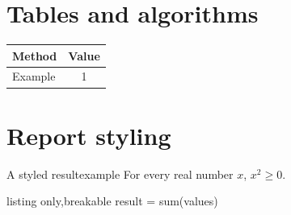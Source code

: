 \documentclass[twocolumn,10pt]{article}
\begin{document}
\section{Tables and algorithms}
\begin{tabular}{lc}
\toprule
Method & Value \\
\midrule
Example & 1 \\
\bottomrule
\end{tabular}
\begin{algorithm}[t]
\;
\end{algorithm}
\section{Report styling}
\begin{result}{A styled result}{example}
\RaggedRight For every real number $x$, $x^2 \geq 0$.
\end{result}
\begin{tcblisting}{listing only,breakable}
result = sum(values)
\end{tcblisting}
\end{document}
